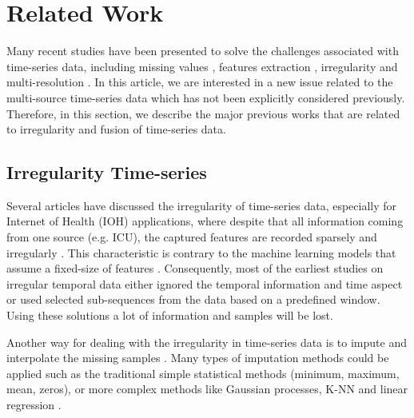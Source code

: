 \documentclass[conference]{IEEEtran}
\begin{document}
\section{Related Work}
Many recent studies have been presented to solve the challenges associated with time-series data, including missing values \cite{cao2018brits,liu2019naomi,ma2020midia,khayati2020mind}, features extraction \cite{zhang2021feature}, irregularity and multi-resolution \cite{pratap2019multi,li2016scalable,shukla2021multi,kidger2020neural}. In this article, we are interested in a new issue related to the multi-source time-series data which has not been explicitly considered previously. 
Therefore, in this section, we describe the major previous works that are related to irregularity and fusion of time-series data.

\subsection{Irregularity Time-series}
Several articles have discussed the irregularity of time-series data, especially for Internet of Health (IOH) applications, where despite that all information coming from one source (e.g. ICU), the captured features are recorded sparsely and irregularly \cite{lipton2016directly,zhang2021feature}. This characteristic is contrary to the machine learning models that assume a fixed-size of features \cite{yadav2018mining}. Consequently, most of the earliest studies on irregular temporal data either ignored the temporal information and time aspect or used selected sub-sequences from the data based on a predefined window. Using these solutions a lot of information and samples will be lost. 

Another way for dealing with the irregularity in time-series data is to impute and interpolate the missing samples \cite{pratap2019multi,che2018recurrent}. Many types of imputation methods could be applied such as the traditional simple statistical methods (minimum, maximum, mean, zeros), or more complex methods like Gaussian processes, K-NN and linear regression \cite{moor2019early, aittokallio2010dealing,zhang2008parimputation,raghunathan2001multivariate}.
\end{document}
